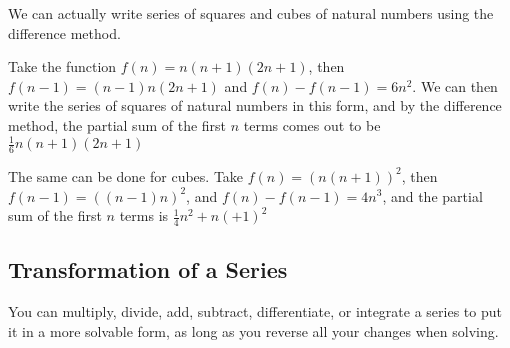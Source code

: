 \documentclass{article}
\begin{document}
We can actually write series of squares and cubes of natural numbers using the difference method.

Take the function $f(n) = n(n+1)(2n+1)$, then $f(n-1) = (n-1)n(2n+1)$ and $f(n) - f(n-1) = 6n^2$. We can then write the series of squares of natural numbers in this form, and by the difference method, the partial sum of the first $n$ terms comes out to be $\frac{1}{6}n(n+1)(2n+1)$

The same can be done for cubes. Take $f(n) = (n(n+1))^2$, then $f(n-1) = ((n-1)n)^2$, and $f(n) - f(n-1) = 4n^3$, and the partial sum of the first $n$ terms is $\frac{1}{4}n^2+n(+1)^2$

\subsection{Transformation of a Series}

You can multiply, divide, add, subtract, differentiate, or integrate a series to put it in a more solvable form, as long as you reverse all your changes when solving. 
\end{document}
